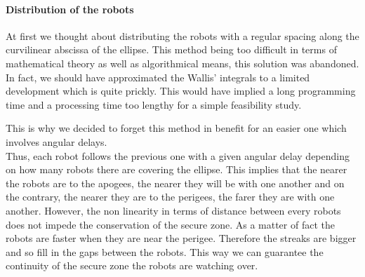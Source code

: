 \paragraph{Distribution of the robots}

At first we thought about distributing the robots with a regular spacing along the curvilinear abscissa of the ellipse. This method being too difficult in terms of mathematical theory as well as algorithmical means, this solution was abandoned. In fact, we should have approximated the Wallis' integrals to a limited development which is quite prickly. This would have implied a long programming time and a processing time too lengthy for a simple feasibility study.

	This is why we decided to forget this method in benefit for an easier one which involves angular delays.\\
Thus, each robot follows the previous one with a given angular delay depending on how many robots there are covering the ellipse. This implies that the nearer the robots are to the apogees, the nearer they will be with one another and on the contrary, the nearer they are to the perigees, the farer they are with one another. However, the non linearity in terms of distance between every robots does not impede the conservation of the secure zone. As a matter of fact the robots are faster when they are near the perigee. Therefore the streaks are bigger and so fill in the gaps between the robots. This way we can guarantee the continuity of the secure zone the robots are watching over.


